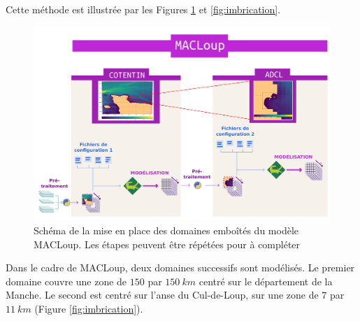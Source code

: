 \documentclass[10pt,a4paper,titlepage]{article}
\begin{document}
Cette méthode est illustrée par les Figures \ref{fig:imbrication_workflow} et \ref{fig:imbrication}.

\begin{figure}[H]
    \centering
    \includegraphics[scale=0.3]{../images/workflow/multi_grid.pdf}
    \caption{Schéma de la mise en place des domaines emboîtés du modèle MACLoup. Les étapes peuvent être répétées pour \alert{à compléter}}
    \label{fig:imbrication_workflow}
\end{figure}

Dans le cadre de MACLoup, deux domaines successifs sont modélisés.
Le premier domaine couvre une zone de $150$ par $150~km$ centré sur le département de la Manche.
Le second est centré sur l'anse du Cul-de-Loup, sur une zone de $7$ par $11~km$ (Figure \ref{fig:imbrication}).

\end{document}
